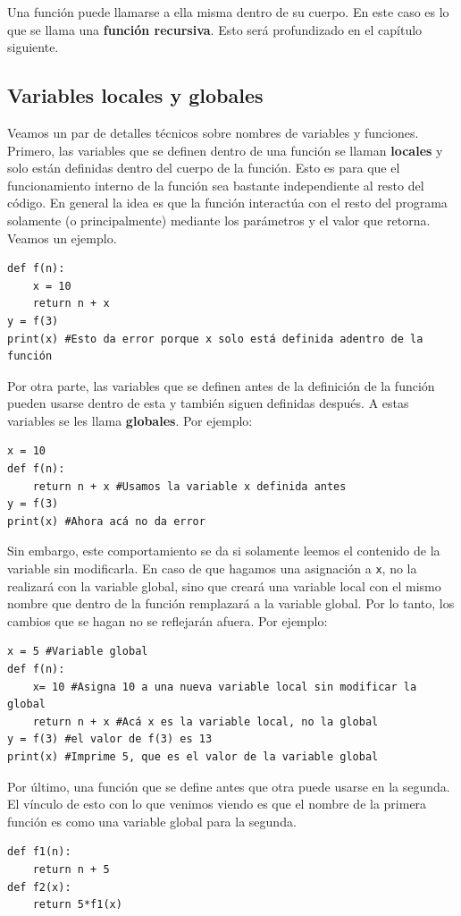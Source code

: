 \documentclass[a4paper, 12pt]{report}
\theoremstyle{definition}
\begin{document}
Una función puede llamarse a ella misma dentro de su cuerpo. En este caso es lo que se llama una {\bf función recursiva}. Esto será profundizado en el capítulo siguiente.

\subsection{Variables locales y globales}
Veamos un par de detalles técnicos sobre nombres de variables y funciones. Primero, las variables que se definen dentro de una función se llaman {\bf locales} y solo están definidas dentro del cuerpo de la función. Esto es para que el funcionamiento interno de la función sea bastante independiente al resto del código. En general la idea es que la función interactúa con el resto del programa solamente (o principalmente) mediante los parámetros y el valor que retorna. Veamos un ejemplo.
\begin{verbatim}
def f(n):
    x = 10
    return n + x
y = f(3)
print(x) #Esto da error porque x solo está definida adentro de la función
\end{verbatim}

Por otra parte, las variables que se definen antes de la definición de la función pueden usarse dentro de esta y también siguen definidas después. A estas variables se les llama {\bf globales}. Por ejemplo:
\begin{verbatim}
x = 10
def f(n):
    return n + x #Usamos la variable x definida antes
y = f(3)
print(x) #Ahora acá no da error
\end{verbatim}
Sin embargo, este comportamiento se da si solamente leemos el contenido de la variable sin modificarla. En caso de que hagamos una asignación a {\tt x}, no la realizará con la variable global, sino que creará una variable local con el mismo nombre que dentro de la función remplazará a la variable global. Por lo tanto, los cambios que se hagan no se reflejarán afuera. Por ejemplo:
\begin{verbatim}
x = 5 #Variable global
def f(n):
    x= 10 #Asigna 10 a una nueva variable local sin modificar la global
    return n + x #Acá x es la variable local, no la global
y = f(3) #el valor de f(3) es 13
print(x) #Imprime 5, que es el valor de la variable global
\end{verbatim}

Por último, una función que se define antes que otra puede usarse en la segunda. El vínculo de esto con lo que venimos viendo es que el nombre de la primera función es como una variable global para la segunda.
\begin{verbatim}
def f1(n):
    return n + 5
def f2(x):
    return 5*f1(x)
\end{verbatim}
\end{document}
